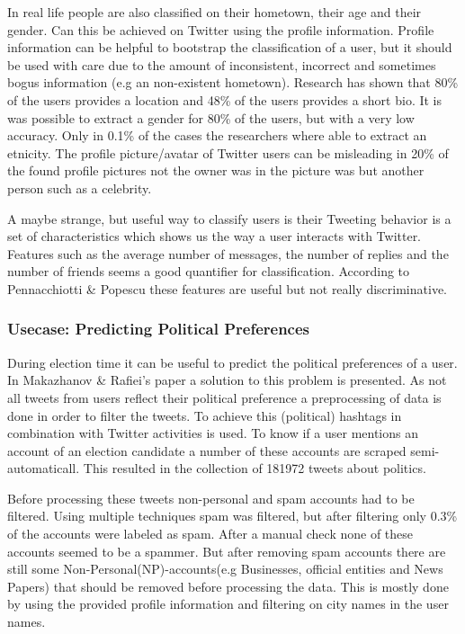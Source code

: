 \documentclass{article}
\begin{document}
In real life people are also classified on their hometown, their age and their gender. Can this be achieved on Twitter using the profile information.  Profile information can be helpful to bootstrap the classification of a user, but it should be used with care due to the amount of inconsistent, incorrect and sometimes bogus information (e.g an non-existent hometown). Research has shown that 80\% of the users provides a location and 48\% of the users provides a short bio. \cite{usermachine} It is was possible to extract a gender for 80\% of the users, but with a very low accuracy. Only in 0.1\% of the cases the researchers where able to extract an etnicity. The profile picture/avatar of Twitter users can be misleading in 20\% of the found profile pictures not the owner was in the picture was but another person such as a celebrity.  \cite{usermachine}

A maybe strange, but useful way to classify users is their   Tweeting behavior is a set of characteristics which shows us the way a user interacts with Twitter. Features such as the average number of messages, the number of replies and the number of friends seems a good quantifier for classification. According to Pennacchiotti \& Popescu these features are useful but not really discriminative. \cite{userclasst} 



\subsubsection{Usecase: Predicting Political Preferences}
During election time it can be useful to predict the political preferences of a user. In Makazhanov \& Raﬁei's paper a solution to this problem is presented. As not all tweets from users reflect their political preference a preprocessing of data is done in order to filter the tweets. \cite{pol} To achieve this (political) hashtags in combination with Twitter activities is used. To know if a user mentions an account of an election candidate a number of these accounts are scraped semi-automaticall. This resulted in the collection of 181972 tweets about politics.\cite{pol}

Before processing these tweets non-personal and spam accounts had to be filtered. Using multiple techniques spam was filtered, but after filtering only 0.3\% of the accounts were labeled as spam. After a manual check none of these accounts seemed to be a spammer. But after removing spam accounts there are still some Non-Personal(NP)-accounts(e.g Businesses, official entities and News Papers)  that should be removed before processing the data. This is mostly done by using the provided profile information and filtering on city names in the user names.  \cite{pol}
\end{document}
